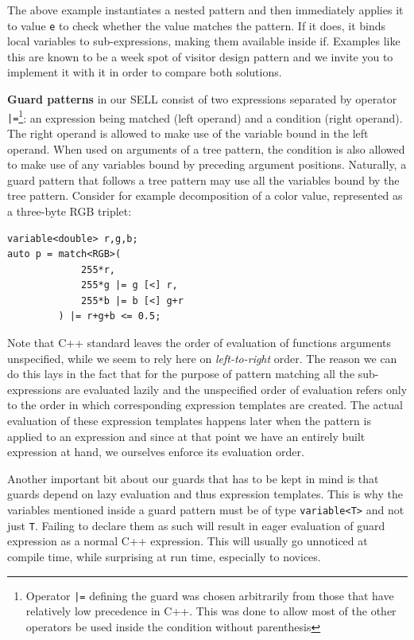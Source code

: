 \documentclass[preprint]{sigplanconf}
\makeatletter
\DeclareRobustCommand{\code}[1]{{\lstinline[breaklines=false,escapechar=@]{#1}}}
\makeatother
\begin{document}
\noindent
The above example instantiates a nested pattern and then immediately applies it 
to value \code{e} to check whether the value matches the pattern. If it does, 
it binds local variables to sub-expressions, making them available inside if.
Examples like this are known to be a week spot of visitor design pattern and we 
invite you to implement it with it in order to compare both solutions.

{\bf Guard patterns} in our SELL consist of two expressions separated by operator 
\code{|=}\footnote{Operator \code{|=} defining the guard was chosen arbitrarily 
from those that have relatively low precedence in C++. This was done to allow 
most of the other operators be used inside the condition without parenthesis}: 
an expression being matched (left operand) and a condition (right operand). The 
right operand is allowed to make use of the variable bound in the left operand. 
When used on arguments of a tree pattern, the condition is also allowed to make 
use of any variables bound by preceding argument positions. Naturally, a guard 
pattern that follows a tree pattern may use all the variables bound by the tree 
pattern. Consider for example decomposition of a color value, represented as a 
three-byte RGB triplet:

\begin{lstlisting}[keepspaces,columns=flexible]
variable<double> r,g,b;
auto p = match<RGB>( 
             255*r, 
             255*g |= g [<] r, 
             255*b |= b [<] g+r
         ) |= r+g+b <= 0.5;
\end{lstlisting}

Note that C++ standard leaves the order of evaluation of functions arguments 
unspecified\cite[.6]{C++0x}, while we seem to rely here on 
\emph{left-to-right} order. The reason we can do this lays in the fact that for 
the purpose of pattern matching all the sub-expressions are evaluated lazily and 
the unspecified order of evaluation refers only to the order in which 
corresponding expression templates are created. The actual evaluation of these 
expression templates happens later when the pattern is applied to an expression 
and since at that point we have an entirely built expression at hand, we 
ourselves enforce its evaluation order.

Another important bit about our guards that has to be kept in mind is that 
guards depend on lazy evaluation and thus expression templates. This is why the 
variables mentioned inside a guard pattern must be of type \code{variable<T>} 
and not just \code{T}. Failing to declare them as such will result in eager 
evaluation of guard expression as a normal C++ expression. This will usually go 
unnoticed at compile time, while surprising at run time, especially to novices.
\end{document}
